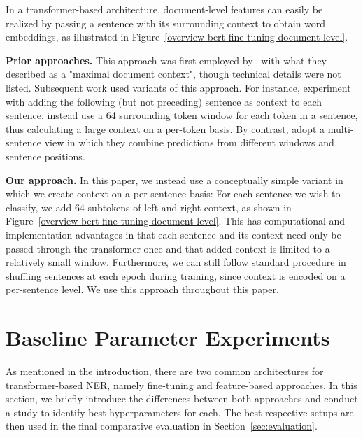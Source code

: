 In a transformer-based architecture, document-level features can easily be realized by passing a sentence with its surrounding context to obtain word embeddings, as illustrated in Figure~\ref{overview-bert-fine-tuning-document-level}. 

\noindent
\textbf{Prior approaches.}
This approach was first employed by~\citet{devlin-etal-2019-bert} with what they described as a "maximal document context", though technical details were not listed. Subsequent work used variants of this approach. For instance, \citet{virtanen2019multilingual} experiment with adding the following (but not preceding) sentence as context to each sentence. \citet{yu-etal-2020-named} instead use a 64 surrounding token window for each token in a sentence, thus calculating a large context on a per-token basis. By contrast, \citet{luoma2020exploring} adopt a multi-sentence view in which they combine predictions from different windows and sentence positions.  

\noindent
\textbf{Our approach.}
In this paper, we instead use a conceptually simple variant in which we create context on a per-sentence basis: For each sentence we wish to classify, we add 64 subtokens of left and right context, as shown in Figure~\ref{overview-bert-fine-tuning-document-level}. This has computational and implementation advantages in that each sentence and its context need only be passed through the transformer once and that added context is limited to a relatively small window. Furthermore, we can still follow standard procedure in shuffling  sentences at each epoch during training, since context is encoded on a per-sentence level. We use this approach throughout this paper. 

\section{Baseline Parameter Experiments}
\label{sec:baseline_experiments}
\vspace{-2mm}

As mentioned in the introduction, there are two common architectures for transformer-based NER, namely fine-tuning and feature-based approaches. In this section, we briefly introduce the differences between both approaches and conduct a study to identify best hyperparameters for each. The best respective setups are then used in the final comparative evaluation in Section~\ref{sec:evaluation}. 

